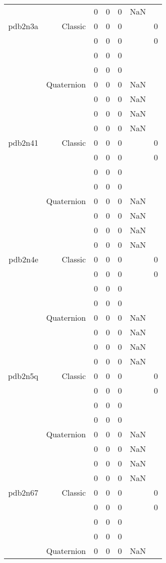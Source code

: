 \begin{xltabular}{\textwidth}{r|rcccSc}
& & 0 & 0 & 0 & NaN & \\ \addlinespace
pdb2n3a & Classic & 0 & 0 & 0 & & 0 \\
& & 0 & 0 & 0 & & 0 \\
& & 0 & 0 & 0 & & \\
& & 0 & 0 & 0 & & \\
& Quaternion & 0 & 0 & 0 & NaN & \\
& & 0 & 0 & 0 & NaN & \\
& & 0 & 0 & 0 & NaN & \\
& & 0 & 0 & 0 & NaN & \\ \addlinespace
pdb2n41 & Classic & 0 & 0 & 0 & & 0 \\
& & 0 & 0 & 0 & & 0 \\
& & 0 & 0 & 0 & & \\
& & 0 & 0 & 0 & & \\
& Quaternion & 0 & 0 & 0 & NaN & \\
& & 0 & 0 & 0 & NaN & \\
& & 0 & 0 & 0 & NaN & \\
& & 0 & 0 & 0 & NaN & \\ \addlinespace
pdb2n4e & Classic & 0 & 0 & 0 & & 0 \\
& & 0 & 0 & 0 & & 0 \\
& & 0 & 0 & 0 & & \\
& & 0 & 0 & 0 & & \\
& Quaternion & 0 & 0 & 0 & NaN & \\
& & 0 & 0 & 0 & NaN & \\
& & 0 & 0 & 0 & NaN & \\
& & 0 & 0 & 0 & NaN & \\ \addlinespace
pdb2n5q & Classic & 0 & 0 & 0 & & 0 \\
& & 0 & 0 & 0 & & 0 \\
& & 0 & 0 & 0 & & \\
& & 0 & 0 & 0 & & \\
& Quaternion & 0 & 0 & 0 & NaN & \\
& & 0 & 0 & 0 & NaN & \\
& & 0 & 0 & 0 & NaN & \\
& & 0 & 0 & 0 & NaN & \\ \addlinespace
pdb2n67 & Classic & 0 & 0 & 0 & & 0 \\
& & 0 & 0 & 0 & & 0 \\
& & 0 & 0 & 0 & & \\
& & 0 & 0 & 0 & & \\
& Quaternion & 0 & 0 & 0 & NaN & \\

\end{xltabular}
